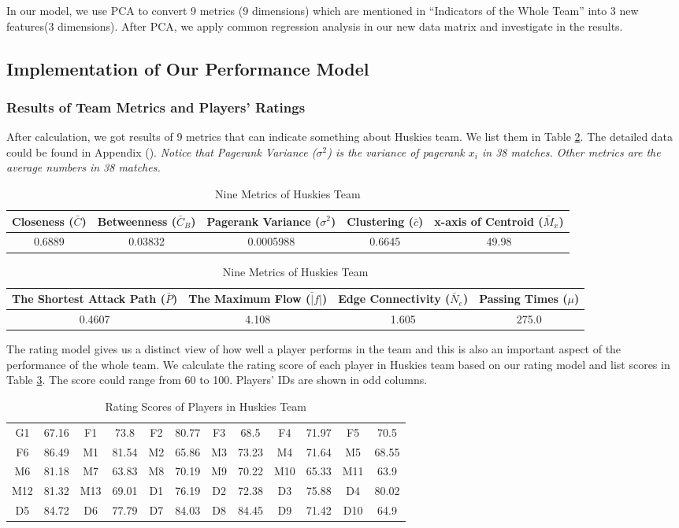 \documentclass[12pt]{mcmthesis}
\begin{document}
	In our model, we use PCA to convert 9 metrics (9 dimensions) which are mentioned in ``Indicators of the Whole Team'' into 3 new features(3 dimensions). After PCA, we apply common regression analysis in our new data matrix and investigate in the results. 
	
\subsection{Implementation of Our Performance Model}
\subsubsection{Results of Team Metrics and Players' Ratings}
	After calculation, we got results of 9 metrics that can indicate something about Huskies team. We list them in Table \ref{tab:metrics}. The detailed data could be found in Appendix (). \textit{Notice that} \textit{Pagerank Variance ($\sigma ^2$) is the variance of pagerank $x_i$ in 38 matches. Other metrics are the average numbers in 38 matches.}
	
	\begin{table}[h]
		\centering
		\caption{Nine Metrics of Huskies Team}
		\label{tab:metrics}
		\begin{tabular}{|c|c|c|c|c|}
			\hline
			Closeness ($\bar C$) & Betweenness ($\bar C_B$) & Pagerank Variance ($\sigma ^2$) & Clustering ($\bar c$) & x-axis of Centroid ($\bar M_x$)\\
			\hline
			0.6889&
			0.03832&
			0.0005988&
			0.6645&
			49.98\\
			\hline
		\end{tabular}
		\begin{tabular}{|c|c|c|c|}\hline
			The Shortest Attack Path ($\bar P$)  &The Maximum Flow ($\bar |f|$) &  Edge Connectivity ($\bar N_e$) & Passing Times ($\mu$)\\
			\hline
			0.4607&
			4.108&
			1.605&
			275.0\\
			\hline
		\end{tabular}
	\end{table}
	The rating model gives us a distinct view of how well a player performs in the team and this is also an important aspect of the performance of the whole team. We calculate the rating score of each player in Huskies team based on our rating model and list scores in Table \ref{tab:score}. The score could range from 60 to 100. Players' IDs are shown in odd columns.
	\begin{table}[h]
	\centering
	\caption{Rating Scores of Players in Huskies Team}
	\label{tab:score}
	\begin{tabular}{|c c|c c|c c|c c|c c|c c|}
		\hline
		G1 &67.16 &F1 &73.8 &F2 &80.77 &F3 &68.5 &F4 &71.97 & F5 & 70.5\\
		F6 &86.49&M1&81.54&M2&65.86&M3&73.23&M4&71.64&M5&68.55\\	
		M6&81.18&M7&63.83&M8&70.19&M9&	70.22&	M10&65.33&M11&63.9\\
		M12&81.32&M13&69.01&D1&76.19&D2&72.38&D3&75.88&D4&80.02\\	
		D5&84.72&D6&77.79&D7&84.03&D8&	84.45&D9&71.42&D10&64.9\\
		\hline
	\end{tabular}
	\end{table}
\end{document}
